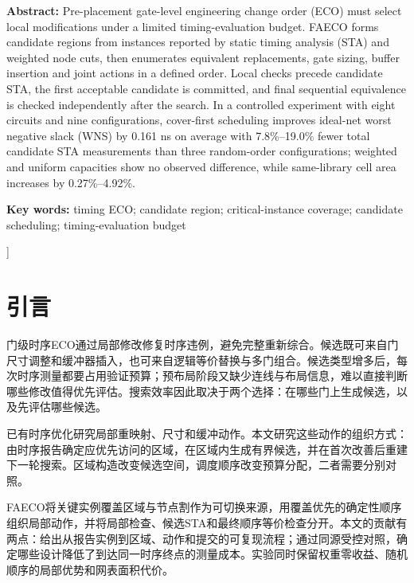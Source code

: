 \documentclass[twocolumn,10pt,fontset=windows]{ctexart}
\begin{document}
\begin{flushleft}
  {\bfseries Abstract:} {\small Pre-placement gate-level engineering change order (ECO) must select local modifications under a limited timing-evaluation budget. FAECO forms candidate regions from instances reported by static timing analysis (STA) and weighted node cuts, then enumerates equivalent replacements, gate sizing, buffer insertion and joint actions in a defined order. Local checks precede candidate STA, the first acceptable candidate is committed, and final sequential equivalence is checked independently after the search. In a controlled experiment with eight circuits and nine configurations, cover-first scheduling improves ideal-net worst negative slack (WNS) by 0.161 ns on average with 7.8\%--19.0\% fewer total candidate STA measurements than three random-order configurations; weighted and uniform capacities show no observed difference, while same-library cell area increases by 0.27\%--4.92\%.}\par
\vspace{3pt}
{\bfseries Key words:} {\small timing ECO; candidate region; critical-instance coverage; candidate scheduling; timing-evaluation budget}\par
\end{flushleft}
]%



\section{引言}

门级时序ECO通过局部修改修复时序违例，避免完整重新综合。候选既可来自门尺寸调整和缓冲器插入，也可来自逻辑等价替换与多门组合。候选类型增多后，每次时序测量都要占用验证预算；预布局阶段又缺少连线与布局信息，难以直接判断哪些修改值得优先评估。搜索效率因此取决于两个选择：在哪些门上生成候选，以及先评估哪些候选。

已有时序优化研究局部重映射、尺寸和缓冲动作\cite{ho2010eco,liu2021rlsizer,chen2024aito}。本文研究这些动作的组织方式：由时序报告确定应优先访问的区域，在区域内生成有界候选，并在首次改善后重建下一轮搜索。区域构造改变候选空间，调度顺序改变预算分配，二者需要分别对照。

FAECO将关键实例覆盖区域与节点割作为可切换来源，用覆盖优先的确定性顺序组织局部动作，并将局部检查、候选STA和最终顺序等价检查分开。本文的贡献有两点：给出从报告实例到区域、动作和提交的可复现流程；通过同源受控对照，确定哪些设计降低了到达同一时序终点的测量成本。实验同时保留权重零收益、随机顺序的局部优势和网表面积代价。
\end{document}
